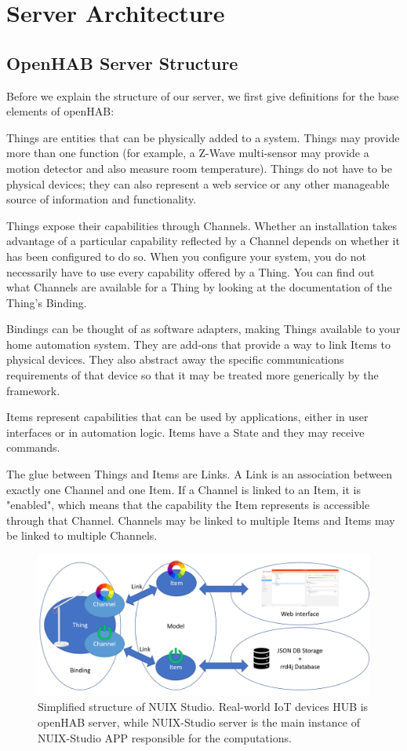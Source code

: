 \section{Server Architecture}
\subsection{OpenHAB Server Structure}

Before we explain the structure of our server, we first give definitions for the base elements of openHAB:

Things are entities that can be physically added to a system. Things may provide more than one function (for example, a Z-Wave multi-sensor may provide a motion detector and also measure room temperature). Things do not have to be physical devices; they can also represent a web service or any other manageable source of information and functionality.

Things expose their capabilities through Channels. Whether an installation takes advantage of a particular capability reflected by a Channel depends on whether it has been configured to do so. When you configure your system, you do not necessarily have to use every capability offered by a Thing. You can find out what Channels are available for a Thing by looking at the documentation of the Thing's Binding.

Bindings can be thought of as software adapters, making Things available to your home automation system. They are add-ons that provide a way to link Items to physical devices. They also abstract away the specific communications requirements of that device so that it may be treated more generically by the framework.

Items represent capabilities that can be used by applications, either in user interfaces or in automation logic. Items have a State and they may receive commands.

The glue between Things and Items are Links. A Link is an association between exactly one Channel and one Item. If a Channel is linked to an Item, it is "enabled", which means that the capability the Item represents is accessible through that Channel. Channels may be linked to multiple Items and Items may be linked to multiple Channels.

\begin{figure}
  \centering
  \includegraphics[width=0.9\linewidth]{figures/openHABServerStructure.png}
  \caption{Simplified structure of NUIX Studio. Real-world IoT devices HUB is openHAB server, while NUIX-Studio server is the main instance of NUIX-Studio APP responsible for the computations.}
  \label{fig:openHABServerStructure-figure}
\end{figure}

